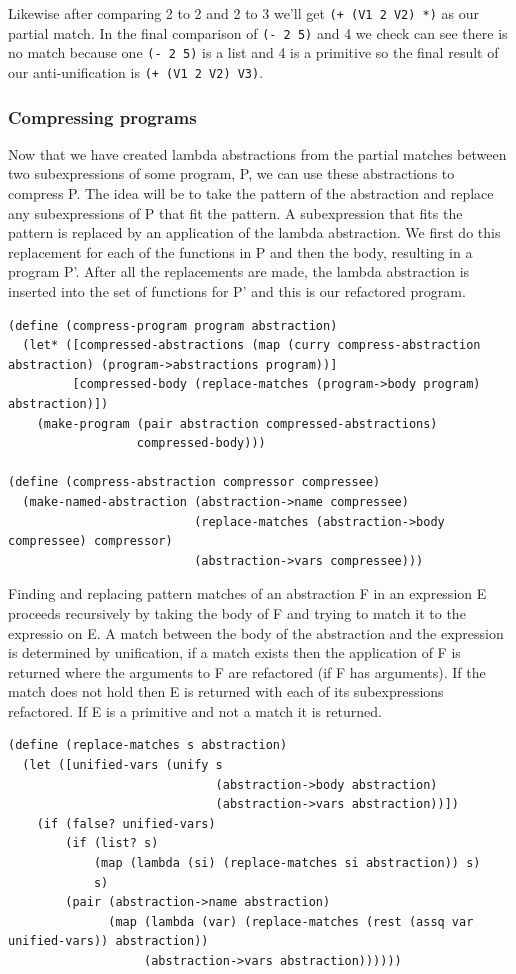 \documentclass[a4paper,10pt]{article}
\begin{document}
Likewise after comparing 2 to 2 and 2 to 3 we'll get \texttt{(+ (V1 2 V2) *)} as our partial match.
In the final comparison of \texttt{(- 2 5)} and 4 we check can see there is no match because one \texttt{(- 2 5)} is a list and 4 is a primitive so the final result of our anti-unification is \texttt{(+ (V1 2 V2) V3)}.


\subsubsection{Compressing programs}
Now that we have created lambda abstractions from the partial matches between two subexpressions of some program, P, we can use these abstractions to compress P.  The idea will be to take the pattern of the abstraction and replace any subexpressions of P that fit the pattern.  A subexpression that fits the pattern is replaced by an application of the lambda abstraction.  We first do this replacement for each of the functions in P and then the body, resulting in a program P'.  After all the replacements are made, the lambda abstraction is inserted into the set of functions for P' and this is our refactored program.
\begin{lstlisting}[frame=trBL]
(define (compress-program program abstraction)
  (let* ([compressed-abstractions (map (curry compress-abstraction abstraction) (program->abstractions program))]
         [compressed-body (replace-matches (program->body program) abstraction)])
    (make-program (pair abstraction compressed-abstractions)
                  compressed-body)))

(define (compress-abstraction compressor compressee)
  (make-named-abstraction (abstraction->name compressee)
                          (replace-matches (abstraction->body compressee) compressor)
                          (abstraction->vars compressee)))                           
\end{lstlisting}
Finding and replacing pattern matches of an abstraction F in an expression E proceeds recursively by taking the body of F and trying to match it to the expressio on E.  A match between the body of the abstraction and the expression is determined by unification, if a match exists then the application of F is returned where the arguments to F are refactored (if F has arguments).  If the match does not hold then E is returned with each of its subexpressions refactored.  If E is a primitive and not a match it is returned.

\begin{lstlisting}[frame=trBL]
(define (replace-matches s abstraction)
  (let ([unified-vars (unify s
                             (abstraction->body abstraction)
                             (abstraction->vars abstraction))])
    (if (false? unified-vars)
        (if (list? s)
            (map (lambda (si) (replace-matches si abstraction)) s)
            s)
        (pair (abstraction->name abstraction)
              (map (lambda (var) (replace-matches (rest (assq var unified-vars)) abstraction))
                   (abstraction->vars abstraction))))))
\end{lstlisting}
\end{document}
